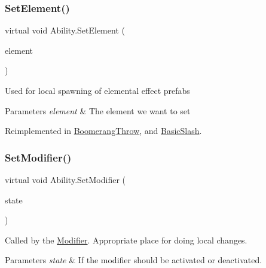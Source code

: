 \hypertarget{class_ability_ad01c565b443fdca24556f1d7c054da3f}{}\label{class_ability_ad01c565b443fdca24556f1d7c054da3f} 
\subsubsection{\texorpdfstring{Set\+Element()}{SetElement()}}
{\footnotesize\ttfamily virtual void Ability.\+Set\+Element (\begin{DoxyParamCaption}\item[{Elemental\+Container.\+Comboable\+Elements}]{element }\end{DoxyParamCaption})\hspace{0.3cm}{\ttfamily [virtual]}}

Used for local spawning of elemental effect prefabs 


\begin{DoxyParams}{Parameters}
{\em element} & The element we want to set\\
\hline
\end{DoxyParams}


Reimplemented in \hyperlink{class_boomerang_throw_aec0765805c6cbbb18eb8ab37395b52f5}{Boomerang\+Throw}, and \hyperlink{class_basic_slash_ae5dd6639a4e305717f5e3344b1cec143}{Basic\+Slash}.

\hypertarget{class_ability_a18f5361c45dc334b541892880382c098}{}\label{class_ability_a18f5361c45dc334b541892880382c098} 
\subsubsection{\texorpdfstring{Set\+Modifier()}{SetModifier()}}
{\footnotesize\ttfamily virtual void Ability.\+Set\+Modifier (\begin{DoxyParamCaption}\item[{bool}]{state }\end{DoxyParamCaption})\hspace{0.3cm}{\ttfamily [virtual]}}



Called by the \hyperlink{class_modifier}{Modifier}. Appropriate place for doing local changes. 


\begin{DoxyParams}{Parameters}
{\em state} & If the modifier should be activated or deactivated.\\
\hline
\end{DoxyParams}


